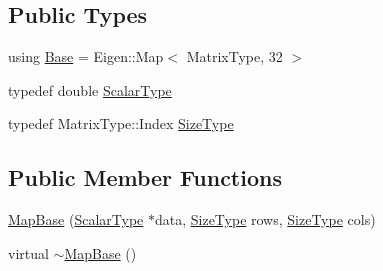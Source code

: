 \subsection*{Public Types}
\begin{DoxyCompactItemize}
\item 
using \hyperlink{structffnn_1_1aligned_1_1_map_base_3_01_matrix_type_00_01double_01_4_a7671de2c0e41dda47c45d4c221d046dd}{Base} = Eigen\-::\-Map$<$ Matrix\-Type, 32 $>$
\item 
typedef double \hyperlink{structffnn_1_1aligned_1_1_map_base_3_01_matrix_type_00_01double_01_4_ae77ad8b86ea2659f96c1a9f1f40e1371}{Scalar\-Type}
\item 
typedef Matrix\-Type\-::\-Index \hyperlink{structffnn_1_1aligned_1_1_map_base_3_01_matrix_type_00_01double_01_4_a45b1c5c40d30eda6790513ed59d472a2}{Size\-Type}
\end{DoxyCompactItemize}
\subsection*{Public Member Functions}
\begin{DoxyCompactItemize}
\item 
\hyperlink{structffnn_1_1aligned_1_1_map_base_3_01_matrix_type_00_01double_01_4_a24d9a12db54c27df4b1a5c5c908d5140}{Map\-Base} (\hyperlink{structffnn_1_1aligned_1_1_map_base_3_01_matrix_type_00_01double_01_4_ae77ad8b86ea2659f96c1a9f1f40e1371}{Scalar\-Type} $\ast$data, \hyperlink{structffnn_1_1aligned_1_1_map_base_3_01_matrix_type_00_01double_01_4_a45b1c5c40d30eda6790513ed59d472a2}{Size\-Type} rows, \hyperlink{structffnn_1_1aligned_1_1_map_base_3_01_matrix_type_00_01double_01_4_a45b1c5c40d30eda6790513ed59d472a2}{Size\-Type} cols)
\item 
virtual \hyperlink{structffnn_1_1aligned_1_1_map_base_3_01_matrix_type_00_01double_01_4_a975a318ae2b419726d2382506e4b8b3c}{$\sim$\-Map\-Base} ()
\end{DoxyCompactItemize}


